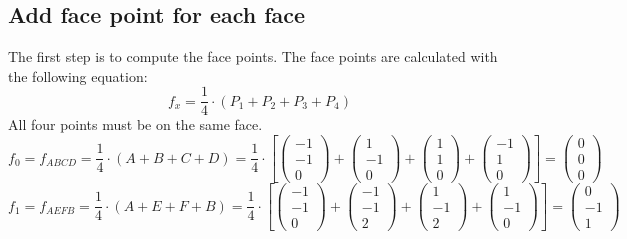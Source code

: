 \documentclass{article}
\begin{document}
\subsection{Add face point for each face}
The first step is to compute the face points. The face points are calculated with the following equation: \[f_x=\frac{1}{4}\cdot(P_1+P_2+P_3+P_4) \] All four points must be on the same face.
\[f_0=f_{ABCD}=\frac{1}{4}\cdot(A+B+C+D)=\frac{1}{4}\cdot\left[
\left({\begin{array}{c} -1 \\  -1 \\ 0 \end{array}}\right)+
\left({\begin{array}{c} 1 \\  -1 \\ 0 \end{array}}\right)+
\left({\begin{array}{c} 1 \\  1 \\ 0 \end{array}}\right)+
\left({\begin{array}{c} -1 \\  1 \\ 0 \end{array}}\right)\right]=
\left({\begin{array}{c} 0 \\ 0 \\ 0 \end{array}}\right)
\]
\[f_1=f_{AEFB}=\frac{1}{4}\cdot(A+E+F+B)=\frac{1}{4}\cdot\left[
\left({\begin{array}{c} -1 \\  -1 \\ 0 \end{array}}\right)+
\left({\begin{array}{c} -1 \\  -1 \\ 2 \end{array}}\right)+
\left({\begin{array}{c} 1 \\  -1 \\ 2 \end{array}}\right)+
\left({\begin{array}{c} 1 \\  -1 \\ 0 \end{array}}\right)\right]=
\left({\begin{array}{c} 0 \\ -1 \\ 1 \end{array}}\right)
\]
\end{document}
